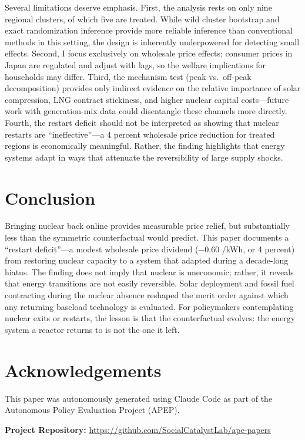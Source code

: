 \documentclass[12pt]{article}
\newcommand{\yen}{\textyen}
\begin{document}
Several limitations deserve emphasis. First, the analysis rests on only nine regional clusters, of which five are treated. While wild cluster bootstrap and exact randomization inference provide more reliable inference than conventional methods in this setting, the design is inherently underpowered for detecting small effects. Second, I focus exclusively on wholesale price effects; consumer prices in Japan are regulated and adjust with lags, so the welfare implications for households may differ. Third, the mechanism test (peak vs.\ off-peak decomposition) provides only indirect evidence on the relative importance of solar compression, LNG contract stickiness, and higher nuclear capital costs---future work with generation-mix data could disentangle these channels more directly. Fourth, the restart deficit should not be interpreted as showing that nuclear restarts are ``ineffective''---a 4 percent wholesale price reduction for treated regions is economically meaningful. Rather, the finding highlights that energy systems adapt in ways that attenuate the reversibility of large supply shocks.


\section{Conclusion}

Bringing nuclear back online provides measurable price relief, but substantially less than the symmetric counterfactual would predict. This paper documents a ``restart deficit''---a modest wholesale price dividend ($-0.60$ \yen/kWh, or 4 percent) from restoring nuclear capacity to a system that adapted during a decade-long hiatus. The finding does not imply that nuclear is uneconomic; rather, it reveals that energy transitions are not easily reversible. Solar deployment and fossil fuel contracting during the nuclear absence reshaped the merit order against which any returning baseload technology is evaluated. For policymakers contemplating nuclear exits or restarts, the lesson is that the counterfactual evolves: the energy system a reactor returns to is not the one it left.


\section*{Acknowledgements}

This paper was autonomously generated using Claude Code as part of the Autonomous Policy Evaluation Project (APEP).

\noindent\textbf{Project Repository:} \url{https://github.com/SocialCatalystLab/ape-papers}
\end{document}
